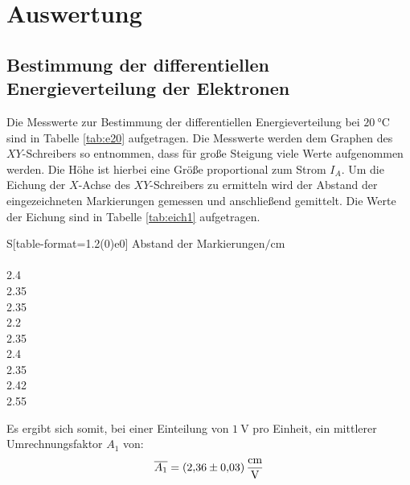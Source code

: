 \section{Auswertung}
\label{sec:Auswertung}
\subsection{Bestimmung der differentiellen Energieverteilung der Elektronen}
Die Messwerte zur Bestimmung der differentiellen Energieverteilung bei $\SI{20}{\degreeCelsius}$ sind in Tabelle \ref{tab:e20} aufgetragen.
Die Messwerte werden dem Graphen des $XY$-Schreibers so entnommen, dass für große Steigung viele Werte aufgenommen werden.
Die Höhe ist hierbei eine Größe proportional zum Strom $I_A$.
Um die Eichung der $X$-Achse des $XY$-Schreibers zu ermitteln wird der Abstand der eingezeichneten Markierungen gemessen und anschließend gemittelt.
Die Werte der Eichung sind in Tabelle \ref{tab:eich1} aufgetragen.

\begin{table}[H]
    \caption{Abstände der Eichmarkierungen.}
    \label{tab:eich1}
    \centering
    \begin{tabular}{S[table-format=1.2(0)e0]}
        \toprule
{Abstand der Markierungen$/\si{\centi\meter}$} \\
		 \\
2.4 \\
2.35 \\
2.35 \\
2.2 \\
2.35 \\
2.4 \\
2.35 \\
2.42 \\
2.55 \\
        \bottomrule
    \end{tabular}
\end{table}
\noindent
Es ergibt sich somit, bei einer Einteilung von $\SI{1}{\volt}$ pro Einheit, ein mittlerer Umrechnungsfaktor $A_1$ von:
\begin{equation}
	\overline{A_1} = \SI{2.36\pm0.03}{\centi\meter\per\volt}
\end{equation}

